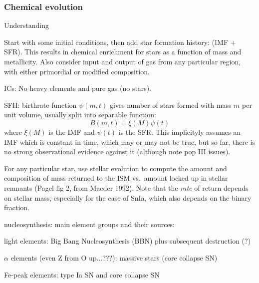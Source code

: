 \documentclass[12pt]{article}
\begin{document}
\subsubsection*{Chemical evolution}
\begin{itemize*} %
    \item Understanding
    \item Start with some initial conditions,
        then add star formation history: (IMF + SFR). This results
        in chemical enrichment for stars as a function of mass and
        metallicity. Also consider input and output of gas from any
        particular region, with either primordial or modified
        composition.
        \begin{itemize*} %
            \item ICs: No heavy elements and pure gas (no stars).
            \item SFH: birthrate function $\psi(m,t)$ gives
                number of stars formed with mass $m$ per unit
                volume, usually split into separable function:
                $$ B(m,t) = \xi(M)\psi(t) $$
                where $\xi(M)$ is the IMF and $\psi(t)$ is the SFR\@.
                This implicityly assumes an IMF which is constant
                in time, which may or may not be true, but so far,
                there is no strong observational evidence against
                it (although note pop III issues).
            \item For any particular star, use stellar evolution
                to compute the amount and composition of mass
                returned to the ISM vs.\ amount locked up in stellar
                remnants (Pagel fig 2, from Maeder 1992). Note that
                the \emph{rate} of return depends on stellar mass,
                especially for the case of SnIa, which also depends
                on the binary fraction.
            \item nucleosynthesis: main element groups and their sources:
            \begin{itemize*} %
                \item light elements: Big Bang Nucleosynthesis (BBN)
                    plus subsequent destruction (?)
                \item $\alpha$ elements (even Z from O up$\ldots$???):
                        massive stars (core collapse SN)
                \item Fe-peak elements: type Ia SN and core collapse SN

\end{itemize*}
\end{itemize*}
\end{itemize*}
\end{document}

